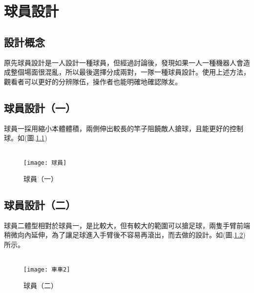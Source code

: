 \chapter{球員設計}
\section{設計概念}
    原先球員設計是一人設計一種球員，但經過討論後，發現如果一人一種機器人會造成整個場面很混亂，所以最後選擇分成兩對，一隊一種球員設計。使用上述方法，觀看者可以更好的分辨隊伍，操作者也能明確地確認隊友。\\[6pt]

\section{球員設計（一）}
    球員一採用縮小本體體積，兩側伸出較長的竿子阻饒敵人搶球，且能更好的控制球。如(圖.\ref{球員})\\[6pt]\\
\begin{figure}[hbt!]
\center
\texttt{[image: 球員]}
\caption{\Large 球員（一）}
\label{球員}
\end{figure}

\section{球員設計（二）}
    球員二體型相對於球員一，是比較大，但有較大的範圍可以搶足球，兩隻手臂前端稍微向內延伸，為了讓足球進入手臂後不容易再滾出，而去做的設計。如(圖.\ref{車車2})所示。\\[6pt]\\
\begin{figure}[hbt!]
\center
\texttt{[image: 車車2]}
\caption{\Large 球員（二）}
\label{車車2}
\end{figure}